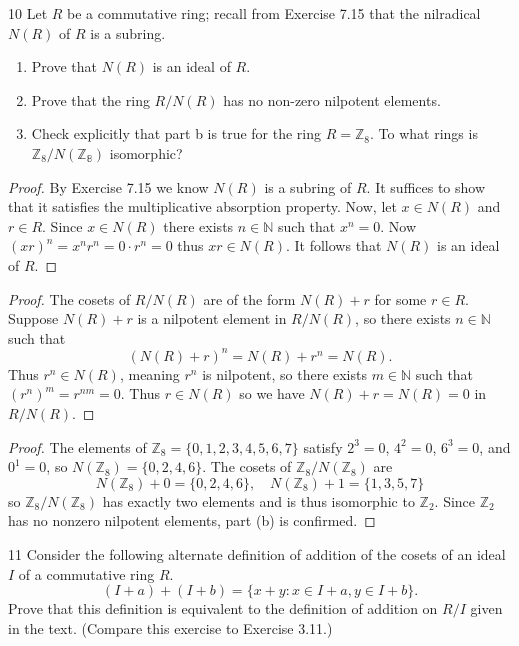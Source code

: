 \begin{problem}{10}
    Let $R$ be a commutative ring; recall from Exercise 7.15 that the nilradical $N(R)$ of $R$ is a subring.
    \begin{enumerate}
        \item Prove that $N(R)$ is an ideal of $R$.
        \item Prove that the ring $R/N(R)$ has no non-zero nilpotent elements.
        \item Check explicitly that part b is true for the ring $R = \mathbb{Z}_8$. To what rings is $\mathbb{Z}_8 / N(\mathbb{Z_8})$ isomorphic?
    \end{enumerate}
\end{problem}
\solved

\begin{proof}
    By Exercise 7.15 we know $N(R)$ is a subring of $R$.
    It suffices to show that it satisfies the multiplicative absorption property.
    Now, let $x \in N(R)$ and $r \in R$.
    Since $x \in N(R)$ there exists $n \in \mathbb{N}$ such that $x^n = 0$.
    Now $(xr)^n = x^n r^n = 0 \cdot r^n = 0$ thus $xr \in N(R)$.
    It follows that $N(R)$ is an ideal of $R$.
\end{proof}

\begin{proof}
    The cosets of $R/N(R)$ are of the form $N(R) + r$ for some $r \in R$.
    Suppose $N(R) + r$ is a nilpotent element in $R/N(R)$, so there exists $n \in \mathbb{N}$ such that
    \[
        (N(R) + r)^n = N(R) + r^n = N(R).
    \]
    Thus $r^n \in N(R)$, meaning $r^n$ is nilpotent, 
        so there exists $m \in \mathbb{N}$ 
        such that $(r^n)^m = r^{nm} = 0$. Thus $r \in N(R)$ so we have $N(R) + r = N(R) = 0$ in $R/N(R)$.
\end{proof}

\begin{proof}
    The elements of $\mathbb{Z}_8 = \{0,1,2,3,4,5,6,7\}$ satisfy $2^3 = 0$, $4^2 = 0$, $6^3 = 0$, and $0^1 = 0$,
    so $N(\mathbb{Z}_8) = \{0,2,4,6\}$. The cosets of $\mathbb{Z}_8/N(\mathbb{Z}_8)$ are
    \[
        N(\mathbb{Z}_8) + 0 = \{0,2,4,6\}, \quad N(\mathbb{Z}_8) + 1 = \{1,3,5,7\}
    \]
    so $\mathbb{Z}_8/N(\mathbb{Z}_8)$ has exactly two elements and is thus isomorphic to $\mathbb{Z}_2$.
    Since $\mathbb{Z}_2$ has no nonzero nilpotent elements, part (b) is confirmed.
\end{proof}

\begin{problem}{11}
    Consider the following alternate definition of addition of the cosets of an ideal
    $I$ of a commutative ring $R$.
    \[(I + a) + (I + b) = \{x + y : x \in I + a, y \in I + b\}.\]
    Prove that this definition is equivalent to the definition of addition on $R/I$ given
    in the text. (Compare this exercise to Exercise 3.11.)
\end{problem}
\unsolved
